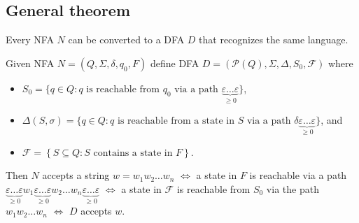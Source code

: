 \documentclass{notes}
\begin{document}
\newpage

\subsection{General theorem}

\begin{thm}
  Every NFA $N$ can be converted to a DFA $D$ that recognizes the same language.
\end{thm}

\begin{prf}
  Given NFA $N = (Q, \Sigma, \delta, q_0, F)$ define DFA $D = (\mathcal P(Q), \Sigma, \Delta, S_0, \mathscr F)$ where 
  \begin{itemize}
    \item $S_0 = \{ q \in Q : \text{$q$ is reachable from $q_0$ via a path $\underbrace{\varepsilon \dots \varepsilon}_{\geq 0}$} \}$, 

    \item $\Delta(S, \sigma) = \{ q \in Q : \text{$q$ is reachable from a state in $S$ via a path $\delta \underbrace{\varepsilon \dots \varepsilon}_{\geq 0}$} \}$, and 

    \item $\mathscr F = \left \{ S \subseteq Q : \text{$S$ contains a state in $F$} \right \}$.
  \end{itemize}
  
  Then $N$ accepts a string $w = w_1 w_2 \dots w_n$ $\Leftrightarrow$ a state in $F$ is reachable via a path $\underbrace{\varepsilon \dots \varepsilon}_{\geq 0} w_1 \underbrace{\varepsilon \dots \varepsilon}_{\geq 0} w_2 \dots w_n \underbrace{\varepsilon \dots \varepsilon}_{\geq 0}$ $\Leftrightarrow$ a state in $\mathscr F$ is reachable from $S_0$ via the path $w_1 w_2 \dots w_n$ $\Leftrightarrow$ $D$ accepts $w$.
\end{prf}
\end{document}
